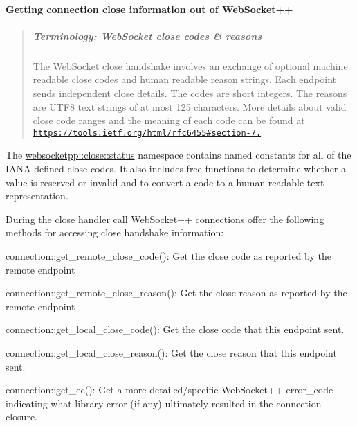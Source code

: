 \paragraph*{Getting connection close information out of Web\+Socket++}

\begin{quote}
\subparagraph*{Terminology\+: Web\+Socket close codes \& reasons}

The Web\+Socket close handshake involves an exchange of optional machine readable close codes and human readable reason strings. Each endpoint sends independent close details. The codes are short integers. The reasons are U\+T\+F8 text strings of at most 125 characters. More details about valid close code ranges and the meaning of each code can be found at \href{https://tools.ietf.org/html/rfc6455#section-7.4}{\tt https\+://tools.\+ietf.\+org/html/rfc6455\#section-\/7.} \end{quote}


The {\ttfamily \hyperlink{namespacewebsocketpp_1_1close_1_1status}{websocketpp\+::close\+::status}} namespace contains named constants for all of the I\+A\+NA defined close codes. It also includes free functions to determine whether a value is reserved or invalid and to convert a code to a human readable text representation.

During the close handler call Web\+Socket++ connections offer the following methods for accessing close handshake information\+:


\begin{DoxyItemize}
\item {\ttfamily connection\+::get\+\_\+remote\+\_\+close\+\_\+code()}\+: Get the close code as reported by the remote endpoint
\item {\ttfamily connection\+::get\+\_\+remote\+\_\+close\+\_\+reason()}\+: Get the close reason as reported by the remote endpoint
\item {\ttfamily connection\+::get\+\_\+local\+\_\+close\+\_\+code()}\+: Get the close code that this endpoint sent.
\item {\ttfamily connection\+::get\+\_\+local\+\_\+close\+\_\+reason()}\+: Get the close reason that this endpoint sent.
\item {\ttfamily connection\+::get\+\_\+ec()}\+: Get a more detailed/specific Web\+Socket++ {\ttfamily error\+\_\+code} indicating what library error (if any) ultimately resulted in the connection closure.
\end{DoxyItemize}

